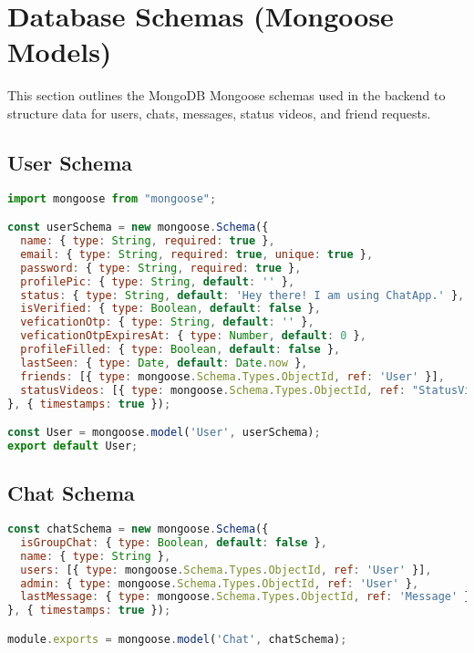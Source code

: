 \documentclass[12pt,a4paper]{report}
\begin{document}
\section{Database Schemas (Mongoose Models)}

This section outlines the MongoDB Mongoose schemas used in the backend to structure data for users, chats, messages, status videos, and friend requests.

\subsection{User Schema}

\begin{lstlisting}[language=JavaScript, caption={User Schema}, label={lst:userschema}]
import mongoose from "mongoose";

const userSchema = new mongoose.Schema({
  name: { type: String, required: true },
  email: { type: String, required: true, unique: true }, 
  password: { type: String, required: true }, 
  profilePic: { type: String, default: '' }, 
  status: { type: String, default: 'Hey there! I am using ChatApp.' },
  isVerified: { type: Boolean, default: false },
  veficationOtp: { type: String, default: '' },
  veficationOtpExpiresAt: { type: Number, default: 0 },
  profileFilled: { type: Boolean, default: false },
  lastSeen: { type: Date, default: Date.now },
  friends: [{ type: mongoose.Schema.Types.ObjectId, ref: 'User' }],
  statusVideos: [{ type: mongoose.Schema.Types.ObjectId, ref: "StatusVideo" }]
}, { timestamps: true });

const User = mongoose.model('User', userSchema);
export default User;
\end{lstlisting}

\subsection{Chat Schema}

\begin{lstlisting}[language=JavaScript, caption={Chat Schema}, label={lst:chatschema}]
const chatSchema = new mongoose.Schema({
  isGroupChat: { type: Boolean, default: false },
  name: { type: String },
  users: [{ type: mongoose.Schema.Types.ObjectId, ref: 'User' }],
  admin: { type: mongoose.Schema.Types.ObjectId, ref: 'User' },
  lastMessage: { type: mongoose.Schema.Types.ObjectId, ref: 'Message' }
}, { timestamps: true });

module.exports = mongoose.model('Chat', chatSchema);
\end{lstlisting}
\end{document}
